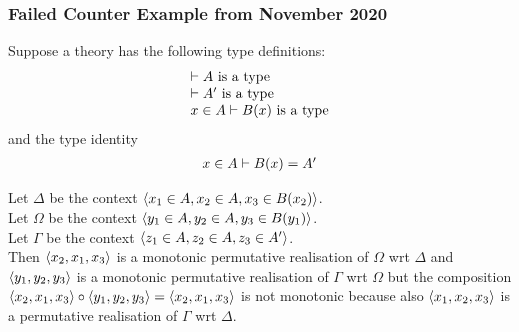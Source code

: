 \documentclass[10pt,a4paper]{scrartcl}
\begin{document}
\subsubsection{Failed Counter Example from November 2020}
\begin{oldtt}
\begin{note}
Suppose a theory has the following type definitions:
\begin{displaymath}
\begin{array}{l}
\vdash A\mbox{ is a type} \\
\vdash A'\mbox{ is a type} \\
x \in A\vdash B(x)\mbox{ is a type} \\
\end{array}
\end{displaymath}
and the type identity
\begin{displaymath}
\begin{array}{l}
x \in A\vdash B(x)=A'
\end{array}
\end{displaymath}

Let $\Delta$ be the context $\langle x_1 \in A, x_2 \in A, x_3 \in B(x_2)  \rangle$. \\

Let $\Omega$ be the context $\langle y_1 \in A, y_2 \in A, y_3 \in B(y_1) \rangle$. \\

Let $\Gamma$ be the context $\langle z_1 \in A, z_2 \in A, z_3 \in A' \rangle$. \\

Then $\langle x_2,x_1,x_3\rangle$ is a  monotonic permutative realisation of $\Omega$ wrt $\Delta$ and 
$\langle y_1,y_2,y_3\rangle$ is a monotonic permutative realisation of $\Gamma$ wrt $\Omega$ but
the composition  $\langle x_2,x_1,x_3\rangle\circ \langle y_1,y_2,y_3\rangle = \langle x_2,x_1,x_3\rangle$
is not monotonic because also $\langle x_1,x_2,x_3\rangle$ is a permutative realisation
of $\Gamma$ wrt $\Delta$. 
\end{note}
\end{oldtt}



\end{document}
